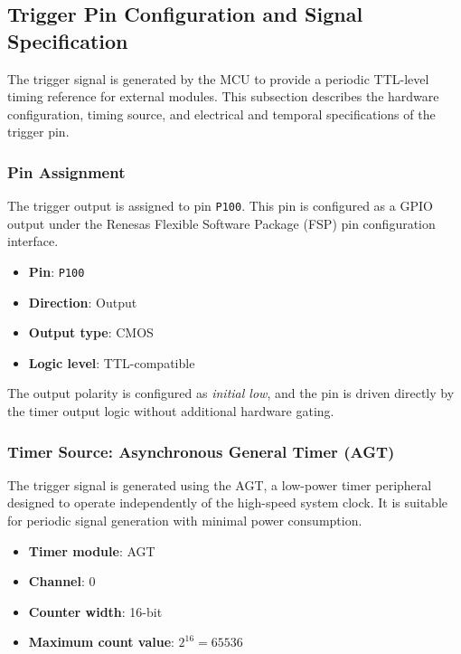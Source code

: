 \documentclass[12pt]{article}
\begin{document}
\subsection{Trigger Pin Configuration and Signal Specification}
\label{subsec:trigger_pin}

The trigger signal is generated by the MCU to provide a periodic TTL-level timing reference for external modules. This subsection describes the hardware configuration, timing source, and electrical and temporal specifications of the trigger pin.

\subsubsection{Pin Assignment}

The trigger output is assigned to pin \texttt{P100}.  
This pin is configured as a GPIO output under the Renesas Flexible Software Package (FSP) pin configuration interface.

\begin{itemize}
    \item \textbf{Pin}: \texttt{P100}
    \item \textbf{Direction}: Output
    \item \textbf{Output type}: CMOS
    \item \textbf{Logic level}: TTL-compatible
\end{itemize}

The output polarity is configured as \emph{initial low}, and the pin is driven directly by the timer output logic without additional hardware gating.

\subsubsection{Timer Source: Asynchronous General Timer (AGT)}

The trigger signal is generated using the AGT, a low-power timer peripheral designed to operate independently of the high-speed system clock. It is suitable for periodic signal generation with minimal power consumption.

\begin{itemize}
    \item \textbf{Timer module}: AGT
    \item \textbf{Channel}: 0
    \item \textbf{Counter width}: 16-bit
    \item \textbf{Maximum count value}: $2^{16} = 65536$
\end{itemize}
\end{document}
